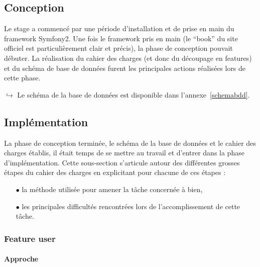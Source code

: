 \documentclass{article}
\newcommand{\blu}[1]{\textcolor{darkblue}{#1}}
\begin{document}
\begin{sffamily}
\subsection{Conception}

Le stage a commencé par une période d'installation et de prise en main du framework Symfony2. Une fois le framework pris en main (le ``book'' du site officiel est 
particulièrement clair et précis), la phase de conception pouvait débuter. La réalisation du cahier des charges (et donc du découpage en features) et du schéma de base de 
données furent les principales actions réalisées lors de cette phase.\\
\vspace*{0.25cm}

$\hookrightarrow$ Le schéma de la base de données est disponible dans l'annexe~\ref{schemabdd}.\vspace*{0.25cm}

\subsection{Implémentation}

La phase de conception terminée, le schéma de la base de données et le cahier des charges établis, il était temps de se mettre au travail et d'entrer dans la phase 
d'implémentation. Cette sous-section s'articule autour des différentes grosses étapes du cahier des charges en explicitant pour chacune de ces étapes :
\begin{itemize}
\item[$\bullet$]la méthode utilisée pour amener la tâche concernée à bien,
\item[$\bullet$]les principales difficultés rencontrées lors de l'accomplissement de cette tâche.
\end{itemize}

\subsubsection{Feature user}

\newcommand{\db}[1]{\blu{``\underline{#1}''}}
\newcommand{\file}[1]{\textit{``#1''}}

\paragraph{Approche}$ $\\


\end{sffamily}
\end{document}
